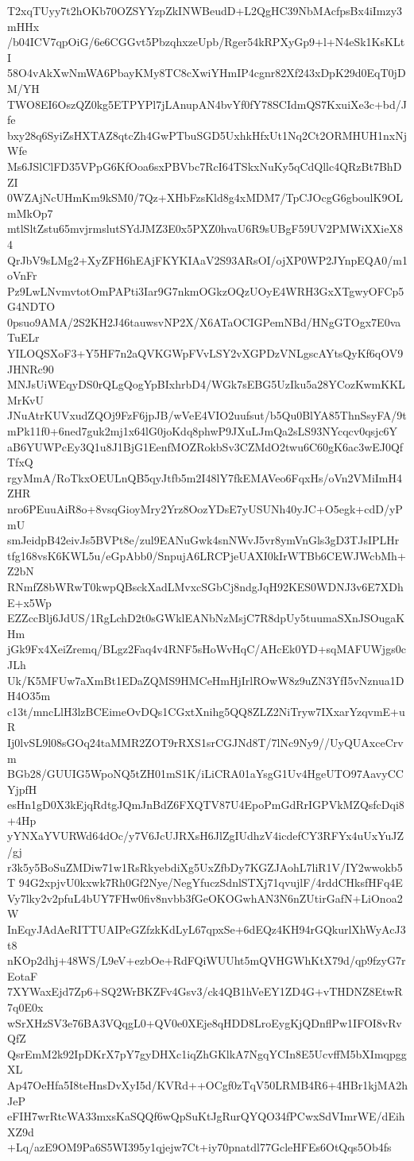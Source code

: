 T2xqTUyy7t2hOKb70OZSYYzpZkINWBeudD+L2QgHC39NbMAcfpsBx4iImzy3mHHx
/b04ICV7qpOiG/6e6CGGvt5PbzqhxzeUpb/Rger54kRPXyGp9+l+N4eSk1KsKLtI
58O4vAkXwNmWA6PbayKMy8TC8cXwiYHmIP4cgnr82Xf243xDpK29d0EqT0jDM/YH
TWO8EI6OszQZ0kg5ETPYPl7jLAnupAN4bvYf0fY78SCIdmQS7KxuiXe3c+bd/Jfe
bxy28q6SyiZsHXTAZ8qtcZh4GwPTbuSGD5UxhkHfxUt1Nq2Ct2ORMHUH1nxNjWfe
Ms6JSlClFD35VPpG6KfOoa6sxPBVbc7RcI64TSkxNuKy5qCdQllc4QRzBt7BhDZI
0WZAjNcUHmKm9kSM0/7Qz+XHbFzsKld8g4xMDM7/TpCJOcgG6gboulK9OLmMkOp7
mtlSltZstu65mvjrmslutSYdJMZ3E0x5PXZ0hvaU6R9sUBgF59UV2PMWiXXieX84
QrJbV9sLMg2+XyZFH6hEAjFKYKIAaV2S93ARsOI/ojXP0WP2JYnpEQA0/m1oVnFr
Pz9LwLNvmvtotOmPAPti3Iar9G7nkmOGkzOQzUOyE4WRH3GxXTgwyOFCp5G4NDTO
0psuo9AMA/2S2KH2J46tauwsvNP2X/X6ATaOCIGPemNBd/HNgGTOgx7E0vaTuELr
YILOQSXoF3+Y5HF7n2aQVKGWpFVvLSY2vXGPDzVNLgscAYtsQyKf6qOV9JHNRc90
MNJsUiWEqyDS0rQLgQogYpBIxhrbD4/WGk7sEBG5UzIku5a28YCozKwmKKLMrKvU
JNuAtrKUVxudZQOj9FzF6jpJB/wVeE4VIO2uufsut/b5Qu0BlYA85ThnSsyFA/9t
mPk11f0+6ned7guk2mj1x64lG0joKdq8phwP9JXuLJmQa2sLS93NYcqcv0qsjc6Y
aB6YUWPcEy3Q1u8J1BjG1EenfMOZRokbSv3CZMdO2twu6C60gK6ac3wEJ0QfTfxQ
rgyMmA/RoTkxOEULnQB5qyJtfb5m2I48lY7fkEMAVeo6FqxHs/oVn2VMiImH4ZHR
nro6PEuuAiR8o+8vsqGioyMry2Yrz8OozYDsE7yUSUNh40yJC+O5egk+cdD/yPmU
smJeidpB42eivJs5BVPt8e/zul9EANuGwk4snNWvJ5vr8ymVnGls3gD3TJsIPLHr
tfg168vsK6KWL5u/eGpAbb0/SnpujA6LRCPjeUAXI0kIrWTBb6CEWJWcbMh+Z2bN
RNmfZ8bWRwT0kwpQBsckXadLMvxcSGbCj8ndgJqH92KES0WDNJ3v6E7XDhE+x5Wp
EZZccBlj6JdUS/1RgLchD2t0sGWklEANbNzMsjC7R8dpUy5tuumaSXnJSOugaKHm
jGk9Fx4XeiZremq/BLgz2Faq4v4RNF5sHoWvHqC/AHcEk0YD+sqMAFUWjgs0cJLh
Uk/K5MFUw7aXmBt1EDaZQMS9HMCeHmHjIrlROwW8z9uZN3YfI5vNznua1DH4O35m
c13t/mncLlH3lzBCEimeOvDQs1CGxtXnihg5QQ8ZLZ2NiTryw7IXxarYzqvmE+uR
Ij0lvSL9l08sGOq24taMMR2ZOT9rRXS1srCGJNd8T/7lNc9Ny9//UyQUAxceCrvm
BGb28/GUUIG5WpoNQ5tZH01mS1K/iLiCRA01aYsgG1Uv4HgeUTO97AavyCCYjpfH
esHn1gD0X3kEjqRdtgJQmJnBdZ6FXQTV87U4EpoPmGdRrIGPVkMZQsfcDqi8+4Hp
yYNXaYVURWd64dOc/y7V6JcUJRXsH6JlZgIUdhzV4icdefCY3RFYx4uUxYuJZ/gj
r3k5y5BoSuZMDiw71w1RsRkyebdiXg5UxZfbDy7KGZJAohL7liR1V/IY2wwokb5T
94G2xpjvU0kxwk7Rh0Gf2Nye/NegYfuczSdnlSTXj71qvujlF/4rddCHksfHFq4E
Vy7lky2v2pfuL4bUY7FHw0fiv8nvbb3fGeOKOGwhAN3N6nZUtirGafN+LiOnoa2W
InEqyJAdAeRITTUAIPeGZfzkKdLyL67qpxSe+6dEQz4KH94rGQkurlXhWyAcJ3t8
nKOp2dhj+48WS/L9eV+ezbOe+RdFQiWUUht5mQVHGWhKtX79d/qp9fzyG7rEotaF
7XYWaxEjd7Zp6+SQ2WrBKZFv4Gsv3/ck4QB1hVeEY1ZD4G+vTHDNZ8EtwR7q0E0x
wSrXHzSV3e76BA3VQqgL0+QV0e0XEje8qHDD8LroEygKjQDnflPw1IFOI8vRvQfZ
QsrEmM2k92IpDKrX7pY7gyDHXc1iqZhGKlkA7NgqYCIn8E5UcvffM5bXImqpggXL
Ap47OeHfa5I8teHnsDvXyI5d/KVRd++OCgf0zTqV50LRMB4R6+4HBr1kjMA2hJeP
eFIH7wrRtcWA33mxsKaSQQf6wQpSuKtJgRurQYQO34fPCwxSdVImrWE/dEihXZ9d
+Lq/azE9OM9Pa6S5WI395y1qjejw7Ct+iy70pnatdl77GcleHFEs6OtQqs5Ob4fs
